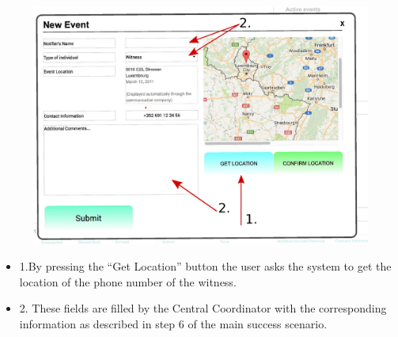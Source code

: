 \begin{minipage}{0.72\textwidth}
\begin{figure}[H]
\includegraphics[width=1.0\textwidth]{GetLocation.eps}
\end{figure}
\end{minipage} \hfill
\begin{minipage}{0.23\textwidth}
\begin{itemize}
\item 1.By pressing the ``Get Location'' button the user asks the system to get the
location of the phone number of the witness.
\item 2. These fields are filled by the Central Coordinator with the corresponding
information as described in step 6 of the main success scenario.
\end{itemize}
\end{minipage}

